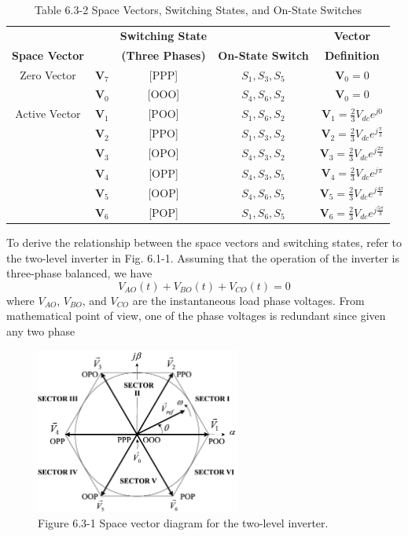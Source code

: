 \documentclass[letterpaper,12pt]{article}
\begin{document}
\begin{table}[h]
    \centering
    \caption{Table 6.3-2 Space Vectors, Switching States, and On-State Switches}
    \begin{tabular}{c c c c c}
    \hline
    & & \textbf{Switching State} & & \textbf{Vector} \\
        \textbf{Space Vector}  & & \textbf{(Three Phases)} & \textbf{On-State Switch} & \textbf{Definition} \\
    \hline
    Zero Vector & $\mathbf{V}_7$ & [PPP] & $S_1, S_3, S_5$ & $\mathbf{V}_0 = 0$ \\
                & $\mathbf{V}_0$ & [OOO] & $S_4, S_6, S_2$ & $\mathbf{V}_0 = 0$ \\ [1em]
    Active Vector & $\mathbf{V}_1$ & [POO] & $S_1, S_6, S_2$ & $\mathbf{V}_1 = \frac{2}{3} V_{dc}e^{j0}$ \\[0.5em]
    & $\mathbf{V}_2$ & [PPO] & $S_1, S_3, S_2$ & $\mathbf{V}_2 = \frac{2}{3} V_{dc}e^{j\frac{\pi}{3}}$ \\[0.5em]
    & $\mathbf{V}_3$ & [OPO] & $S_4, S_3, S_2$ & $\mathbf{V}_3 = \frac{2}{3} V_{dc}e^{j\frac{2\pi}{3}}$ \\[0.5em]
    & $\mathbf{V}_4$ & [OPP] & $S_4, S_3, S_5$ & $\mathbf{V}_4 = \frac{2}{3} V_{dc}e^{j\pi}$ \\[0.5em]
    & $\mathbf{V}_5$ & [OOP] & $S_4, S_6, S_5$ & $\mathbf{V}_5 = \frac{2}{3} V_{dc}e^{j\frac{4\pi}{3}}$ \\[0.5em]
    & $\mathbf{V}_6$ & [POP] & $S_1, S_6, S_5$ & $\mathbf{V}_6 = \frac{2}{3} V_{dc}e^{j\frac{5\pi}{3}}$ \\[0.5em]
    \hline
    \end{tabular}
    \label{table:space_vectors}
\end{table}
\FloatBarrier
    
To derive the relationship between the space vectors and switching states, refer to the two-level inverter in Fig. 6.1-1. Assuming that the operation of the inverter is three-phase balanced, we have
\[
V_{AO}(t) + V_{BO}(t) + V_{CO}(t) = 0
\]
where $V_{AO}$, $V_{BO}$, and $V_{CO}$ are the instantaneous load phase voltages. From mathematical point of view, one of the phase voltages is redundant since given any two phase
    
\begin{figure}[h]
    \centering
    \includegraphics[width=0.6\textwidth]{graficos/img99.jpg}
    \caption{Figure 6.3-1 Space vector diagram for the two-level inverter.}
    \label{fig:space_vector_diagram}
\end{figure}
\FloatBarrier
\end{document}
